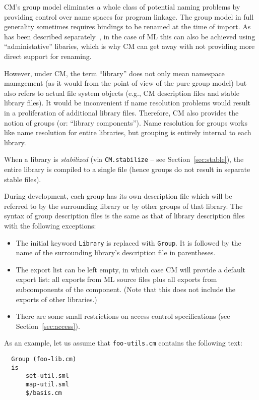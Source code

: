 \documentclass[titlepage,letterpaper]{article}
\begin{document}
CM's group model eliminates a whole class of potential naming problems
by providing control over name spaces for program linkage.  The group
model in full generality sometimes requires bindings to be renamed at
the time of import. As has been described
separately~\cite{blume:appel:cm99}, in the case of ML this can also be
achieved using ``administative'' libaries, which is why CM can get
away with not providing more direct support for renaming.

However, under CM, the term ``library'' does not only mean namespace
management (as it would from the point of view of the pure group
model) but also refers to actual file system objects (e.g., CM
description files and stable library files).  It would be inconvenient
if name resolution problems would result in a proliferation of
additional library files.  Therefore, CM also provides the notion of
groups (or: ``library components'').  Name resolution for groups works
like name resolution for entire libraries, but grouping is entirely
internal to each library.

When a library is {\em stabilized} (via {\tt CM.stabilize} -- see
Section~\ref{sec:stable}), the entire library is compiled to a single
file (hence groups do not result in separate stable files).

During development, each group has its own description file which will
be referred to by the surrounding library or by other groups of that
library. The syntax of group description files is the same as that of
library description files with the following exceptions:

\begin{itemize}
\item The initial keyword {\tt Library} is replaced with {\tt Group}.
It is followed by the name of the surrounding library's description
file in parentheses.
\item The export list can be left empty, in which case CM will provide
a default export list: all exports from ML source files plus all
exports from subcomponents of the component.  (Note that this does not
include the exports of other libraries.)
\item There are some small restrictions on access control
specifications (see Section~\ref{sec:access}).
\end{itemize}

As an example, let us assume that
{\tt foo-utils.cm} contains the following text:

\begin{verbatim}
  Group (foo-lib.cm)
  is
      set-util.sml
      map-util.sml
      $/basis.cm
\end{verbatim}
\end{document}

